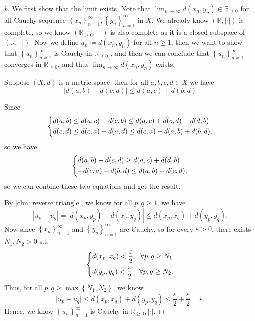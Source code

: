 \begin{proof}[b]
  We first show that the limit exists. Note that \(\lim_{n \to \infty} d(x_n, y_n) \in \mathbb{R}_{\ge 0} \) for all Cauchy sequence \(\left\{ x_n \right\}_{n=1}^{\infty} , \left\{ y_n \right\}_{n=1}^{\infty}   \) in \(X\). We already know \((\mathbb{R}, \vert \cdot \vert ) \) is complete, so we know \((\mathbb{R} _{\ge 0}, \vert \cdot \vert )\) is also complete as it is a closed subspace of \((\mathbb{R}, \vert \cdot \vert ) \). Now we define \(u_n \coloneqq d(x_n, y_n)\) for all \(n \ge 1\), then we want to show that \(\left\{ u_n \right\}_{n=1}^{\infty}  \) is Cauchy in \(\mathbb{R}_{\ge 0}\) , and then we can conclude that \(\left\{ u_n \right\}_{n=1}^{\infty}  \) converges in \(\mathbb{R} _{\ge 0}\), and thus \(\lim_{n \to \infty} d(x_n, y_n) \) exists.
 \begin{claim} \label{clm: reverse triangle}
  Suppose \((X, d)\) is a metric space, then for all \(a, b, c, d \in X\) we have 
  \[
    \left\vert d(a, b) - d(c, d) \right\vert \le d(a, c) + d(b, d)
  \]  
 \end{claim}
 \begin{explanation}
    Since
    \[
      \begin{dcases}
        d(a, b) \le d(a, c) + d(c, b) \le d(a, c) + d(c, d) + d(d, b) \\
        d(c, d) \le d(c, a) + d(a, d) \le d(c, a) + d(a, b) + d(b, d),
      \end{dcases}
    \] so we have 
    \[
      \begin{dcases}
        d(a, b) - d(c, d) \ge d(a, c) + d(d, b) \\
        -d(c, a) - d(b, d) \le d(a, b) - d(c, d),
      \end{dcases}
    \] so we can conbine these two equations and get the result.
 \end{explanation}
  By \autoref{clm: reverse triangle}, we know for all \(p, q \ge 1\), we have 
  \[
    \left\vert u_p - u_q \right\vert = \left\vert d(x_p, y_p) - d(x_q, y_q) \right\vert \le d(x_p, x_q) + d(y_p, y_q).
  \]  
  Now since \(\left\{ x_n \right\}_{n=1}^{\infty}  \) and \(\left\{ y_n \right\}_{n=1}^{\infty }  \) are Cauchy, so for every \(\varepsilon > 0\), there exists \(N_1, N_2 > 0\) s.t. 
  \[
    \begin{dcases}
      d(x_p, x_q) < \frac{\varepsilon}{2} \quad \forall p, q \ge N_1 \\
      d(y_p, y_q) < \frac{\varepsilon}{2} \quad \forall p, q \ge N_2.
    \end{dcases}
  \]   
  Thus, for all \(p, q \ge \max \left\{ N_1, N_2 \right\} \), we know
  \[
    \vert u_p - u_q \vert \le d(x_p, x_q) + d(y_p, y_q) \le \frac{\varepsilon}{2} + \frac{\varepsilon}{2} = \varepsilon.
  \]
  Hence, we know \(\left\{ u_n \right\}_{n=1}^{\infty}  \) is Cauchy in \(\mathbb{R}_{\ge 0}, \vert \cdot \vert \).  


\end{proof}
